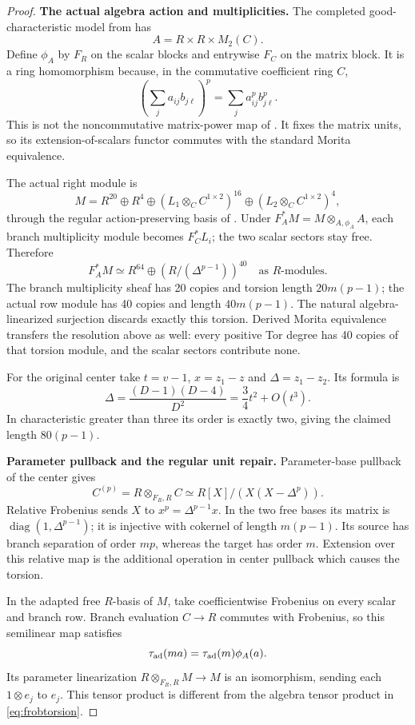 \begin{proof}
\par\smallskip\noindent\textbf{The actual algebra action and multiplicities.}\quad
The completed good-characteristic model from  has
\[
 A=R\times R\times M_2(C).
\]
Define $\phi_A$ by $F_R$ on the scalar blocks and entrywise $F_C$
on the matrix block. It is a ring homomorphism because, in the
commutative coefficient ring $C$,
\[
 \left(\sum_j a_{ij}b_{j\ell}\right)^p
       =\sum_j a_{ij}^p b_{j\ell}^p.
\]
This is not the noncommutative matrix-power map of .
It fixes the matrix units, so its extension-of-scalars functor
commutes with the standard Morita equivalence.

The actual right module is
\[
 M=R^{20}\oplus R^4\oplus
    (L_1\otimes_C C^{1\times2})^{16}
       \oplus(L_2\otimes_C C^{1\times2})^4,
\]
through the regular action-preserving basis of . Under
$F_A^*M=M\otimes_{A,\phi_A}A$, each branch multiplicity module
becomes $F_C^*L_i$; the two scalar sectors stay free. Therefore
\begin{equation}\label{eq:frobtorsion}
 F_A^*M\simeq R^{64}\oplus
          (R/(\Delta^{p-1}))^{40}
 \quad\text{as }R\text{-modules}.
\end{equation}
The branch multiplicity sheaf has 20 copies and torsion length
$20m(p-1)$; the actual row module has 40 copies and length
$40m(p-1)$. The natural algebra-linearized surjection discards
exactly this torsion. Derived Morita equivalence transfers the
resolution above as well: every positive Tor degree has 40 copies
of that torsion module, and the scalar sectors contribute none.

For the original center take $t=v-1$, $x=z_1-z$ and
$\Delta=z_1-z_2$. Its formula is
\[
 \Delta=\frac{(D-1)(D-4)}{D^2}
        =\frac34t^2+O(t^3).
\]
In characteristic greater than three its order is exactly two,
giving the claimed length $80(p-1)$.

\par\smallskip\noindent\textbf{Parameter pullback and the regular unit repair.}\quad
Parameter-base pullback of the center gives
\[
 C^{(p)}=R\otimes_{F_R,R}C
       \simeq R[X]/(X(X-\Delta^p)).
\]
Relative Frobenius sends $X$ to $x^p=\Delta^{p-1}x$.
In the two free bases its matrix is
$\operatorname{diag}(1,\Delta^{p-1})$; it is injective with
cokernel of length $m(p-1)$. Its source has branch separation of
order $mp$, whereas the target has order $m$. Extension over this
relative map is the additional operation in center pullback which
causes the torsion.

In the adapted free $R$-basis of $M$, take coefficientwise
Frobenius on every scalar and branch row. Branch evaluation
$C\to R$ commutes with Frobenius, so this semilinear map satisfies
\[
 \tau_{\rm ad}(ma)=\tau_{\rm ad}(m)\phi_A(a).
\]
Its parameter linearization
$R\otimes_{F_R,R}M\to M$ is an isomorphism, sending each
$1\otimes e_j$ to $e_j$. This tensor product is different from
the algebra tensor product in \eqref{eq:frobtorsion}.


\end{proof}

